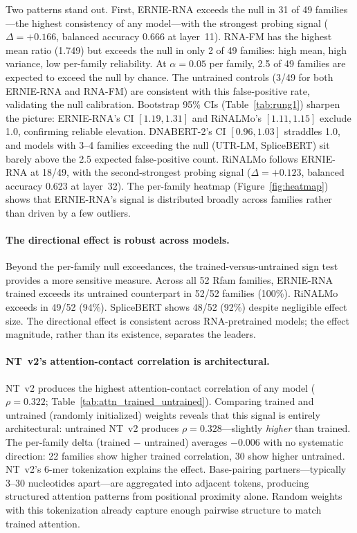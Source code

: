 \documentclass[11pt]{article}
\begin{document}
Two patterns stand out. First, ERNIE-RNA exceeds the null in 31 of
49 families---the highest consistency of any model---with the
strongest probing signal ($\Delta = +0.166$, balanced accuracy 0.666
at layer~11). RNA-FM has the highest mean ratio (1.749) but exceeds
the null in only 2 of 49 families: high mean, high variance, low
per-family reliability. At $\alpha = 0.05$ per family, 2.5 of 49
families are expected to exceed the null by chance. The untrained
controls (3/49 for both ERNIE-RNA and RNA-FM) are consistent with
this false-positive rate, validating the null calibration.
Bootstrap 95\% CIs (Table~\ref{tab:rung1}) sharpen the picture:
ERNIE-RNA's CI $[1.19, 1.31]$ and RiNALMo's $[1.11, 1.15]$ exclude
1.0, confirming reliable elevation. DNABERT-2's CI $[0.96, 1.03]$
straddles 1.0, and models with 3--4 families exceeding the null
(UTR-LM, SpliceBERT) sit barely above the 2.5 expected false-positive
count. RiNALMo follows ERNIE-RNA at 18/49, with the second-strongest
probing signal ($\Delta = +0.123$, balanced accuracy 0.623 at
layer~32). The per-family heatmap
(Figure~\ref{fig:heatmap}) shows that ERNIE-RNA's signal is
distributed broadly across families rather than driven by a few
outliers.

\paragraph{The directional effect is robust across models.}
Beyond the per-family null exceedances, the trained-versus-untrained
sign test provides a more sensitive measure. Across all 52 Rfam
families, ERNIE-RNA trained exceeds its untrained counterpart in
52/52 families (100\%). RiNALMo exceeds in 49/52 (94\%). SpliceBERT
shows 48/52 (92\%) despite negligible effect size. The directional
effect is consistent across RNA-pretrained models; the effect
magnitude, rather than its existence, separates the leaders.

\paragraph{NT~v2's attention-contact correlation is architectural.}
NT~v2 produces the highest attention-contact correlation of any model
($\rho = 0.322$; Table~\ref{tab:attn_trained_untrained}). Comparing
trained and untrained (randomly initialized) weights reveals that this
signal is entirely architectural: untrained NT~v2 produces
$\rho = 0.328$---slightly \emph{higher} than trained.
The per-family delta (trained $-$ untrained) averages $-0.006$
with no systematic direction: 22 families show higher trained
correlation, 30 show higher untrained. NT~v2's 6-mer tokenization
explains the effect. Base-pairing partners---typically 3--30
nucleotides apart---are aggregated into adjacent tokens, producing
structured attention patterns from positional proximity alone. Random
weights with this tokenization already capture enough pairwise
structure to match trained attention.
\end{document}
